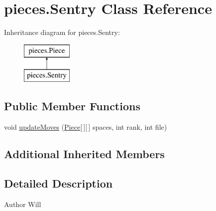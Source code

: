 \hypertarget{classpieces_1_1_sentry}{\section{pieces.\-Sentry Class Reference}
\label{classpieces_1_1_sentry}
}
Inheritance diagram for pieces.\-Sentry\-:\begin{figure}[H]
\begin{center}
\leavevmode
\includegraphics[height=2.000000cm]{classpieces_1_1_sentry}
\end{center}
\end{figure}
\subsection*{Public Member Functions}
\begin{DoxyCompactItemize}
\item 
void \hyperlink{classpieces_1_1_sentry_adcb012c99152748beac7471025a80ba0}{update\-Moves} (\hyperlink{classpieces_1_1_piece}{Piece}\mbox{[}$\,$\mbox{]}\mbox{[}$\,$\mbox{]} spaces, int rank, int file)
\end{DoxyCompactItemize}
\subsection*{Additional Inherited Members}


\subsection{Detailed Description}
\begin{DoxyAuthor}{Author}
Will 
\end{DoxyAuthor}


